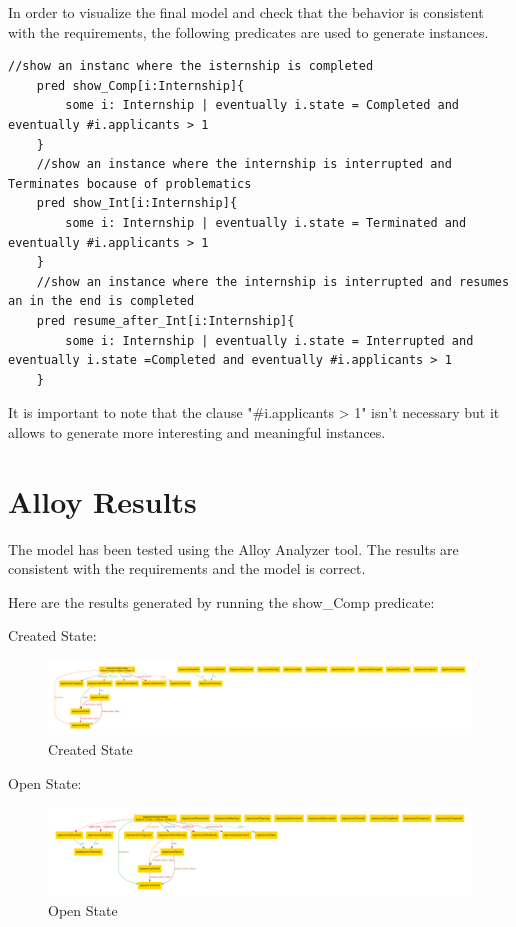 \par In order to visualize the final model and check that the behavior is consistent with the requirements, the following predicates are used to generate instances.

\begin{lstlisting}[language= Alloy]
    //show an instanc where the isternship is completed
    pred show_Comp[i:Internship]{
        some i: Internship | eventually i.state = Completed and eventually #i.applicants > 1
    }
    //show an instance where the internship is interrupted and Terminates bocause of problematics
    pred show_Int[i:Internship]{
        some i: Internship | eventually i.state = Terminated and eventually #i.applicants > 1
    }
    //show an instance where the internship is interrupted and resumes an in the end is completed
    pred resume_after_Int[i:Internship]{
        some i: Internship | eventually i.state = Interrupted and  eventually i.state =Completed and eventually #i.applicants > 1
    }
\end{lstlisting}

\par It is important to note that the clause "\#i.applicants > 1" isn't necessary but it allows to generate more interesting and meaningful instances.

\section{Alloy Results}%
\label{sec:Alloy-Results}%

\par The model has been tested using the Alloy Analyzer tool. The results are consistent with the requirements and the model is correct.
\par Here are the results generated by running the show\_Comp predicate:

\par Created State:

\begin{figure}[H]
    \centering
    \includegraphics[width=1\textwidth]{Images/Alloy_images/Alloy_1-1.pdf}
    \caption{Created State}
\end{figure}

\par Open State:
\begin{figure}[H]
    \centering
    \includegraphics[width=1\textwidth]{Images/Alloy_images/Alloy_1-2.pdf}
    \caption{Open State}
\end{figure}

